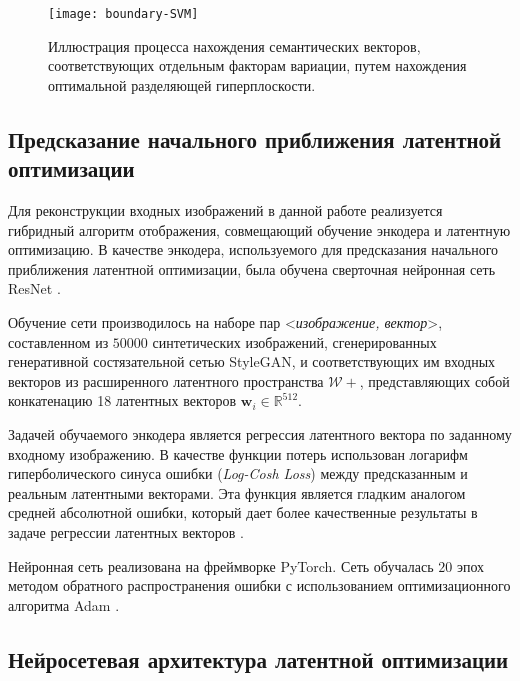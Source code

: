 \begin{figure}[h]
\begin{center}
    \texttt{[image: boundary-SVM]}
    \caption{Иллюстрация процесса нахождения семантических векторов, соответствующих отдельным факторам вариации, путем нахождения оптимальной разделяющей гиперплоскости.}
    \label{fig:svm-boundary}
\end{center}
\end{figure}


\subsection{Предсказание начального приближения латентной оптимизации}

Для реконструкции входных изображений в данной работе реализуется гибридный алгоритм отображения, совмещающий обучение энкодера и латентную оптимизацию.
В качестве энкодера, используемого для предсказания начального приближения латентной оптимизации, была обучена сверточная нейронная сеть ResNet \cite{he2016resnet}.

Обучение сети производилось на наборе пар <\emph{изображение, вектор}>, составленном из $50000$ синтетических изображений, сгенерированных генеративной состязательной сетью StyleGAN, и соответствующих им входных векторов из расширенного латентного пространства $\mathcal W+$, представляющих собой конкатенацию 18 латентных векторов $\mathbf w_i \in \mathbb R^{512}$.

Задачей обучаемого энкодера является регрессия латентного вектора по заданному входному изображению.
В качестве функции потерь использован логарифм гиперболического синуса ошибки (\emph{Log-Cosh Loss}) между предсказанным и реальным латентными векторами. Эта функция является гладким аналогом средней абсолютной ошибки, который дает более качественные результаты в задаче регрессии латентных векторов \cite{chen2019log}.

Нейронная сеть реализована на фреймворке PyTorch. Сеть обучалась $20$ эпох методом обратного распространения ошибки с использованием оптимизационного алгоритма Adam \cite{kingma2014adam}.



\subsection{Нейросетевая архитектура латентной оптимизации}


